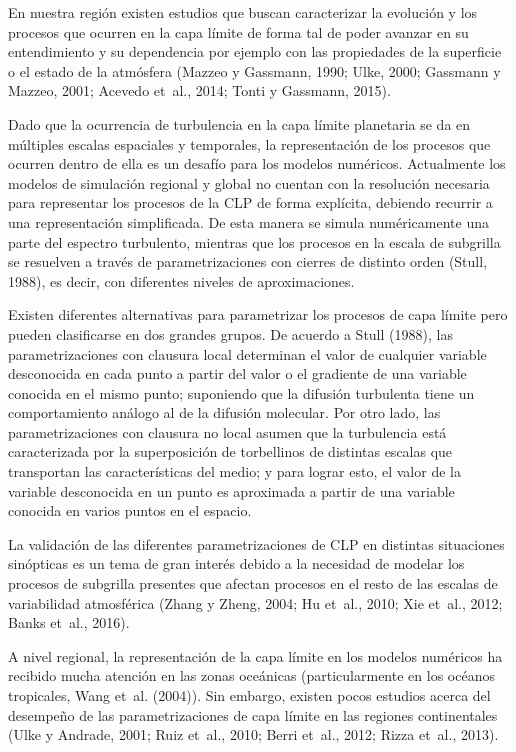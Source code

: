 \documentclass[12pt,spanish,oneside, a4paper]{book}
\begin{document}
En nuestra región existen estudios que buscan caracterizar la evolución
y los procesos que ocurren en la capa límite de forma tal de poder
avanzar en su entendimiento y su dependencia por ejemplo con las
propiedades de la superficie o el estado de la atmósfera (Mazzeo y
Gassmann, 1990; Ulke, 2000; Gassmann y Mazzeo, 2001; Acevedo et~al.,
2014; Tonti y Gassmann, 2015).

Dado que la ocurrencia de turbulencia en la capa límite planetaria se da
en múltiples escalas espaciales y temporales, la representación de los
procesos que ocurren dentro de ella es un desafío para los modelos
numéricos. Actualmente los modelos de simulación regional y global no
cuentan con la resolución necesaria para representar los procesos de la
CLP de forma explícita, debiendo recurrir a una representación
simplificada. De esta manera se simula numéricamente una parte del
espectro turbulento, mientras que los procesos en la escala de subgrilla
se resuelven a través de parametrizaciones con cierres de distinto orden
(Stull, 1988), es decir, con diferentes niveles de aproximaciones.

Existen diferentes alternativas para parametrizar los procesos de capa
límite pero pueden clasificarse en dos grandes grupos. De acuerdo a
Stull (1988), las parametrizaciones con clausura local determinan el
valor de cualquier variable desconocida en cada punto a partir del valor
o el gradiente de una variable conocida en el mismo punto; suponiendo
que la difusión turbulenta tiene un comportamiento análogo al de la
difusión molecular. Por otro lado, las parametrizaciones con clausura no
local asumen que la turbulencia está caracterizada por la superposición
de torbellinos de distintas escalas que transportan las características
del medio; y para lograr esto, el valor de la variable desconocida en un
punto es aproximada a partir de una variable conocida en varios puntos
en el espacio.

La validación de las diferentes parametrizaciones de CLP en distintas
situaciones sinópticas es un tema de gran interés debido a la necesidad
de modelar los procesos de subgrilla presentes que afectan procesos en
el resto de las escalas de variabilidad atmosférica (Zhang y Zheng,
2004; Hu et~al., 2010; Xie et~al., 2012; Banks et~al., 2016).

A nivel regional, la representación de la capa límite en los modelos
numéricos ha recibido mucha atención en las zonas oceánicas
(particularmente en los océanos tropicales, Wang et~al. (2004)). Sin
embargo, existen pocos estudios acerca del desempeño de las
parametrizaciones de capa límite en las regiones continentales (Ulke y
Andrade, 2001; Ruiz et~al., 2010; Berri et~al., 2012; Rizza et~al.,
2013).
\end{document}
